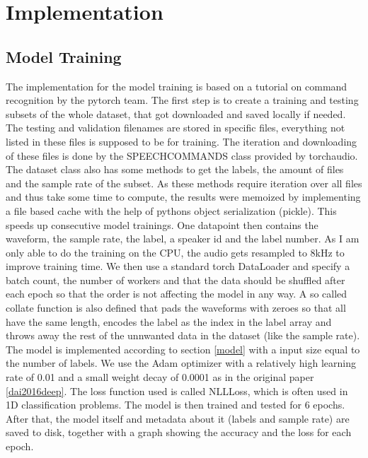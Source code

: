 \chapter{Implementation}

\section{Model Training}
The implementation for the model training is based on a tutorial on command recognition by the pytorch team\cite{tutorial}. The first step is to create a training and 
testing subsets of the whole dataset, that got downloaded and saved locally if needed. The testing and validation filenames are stored in specific files, everything not
listed in these files is supposed to be for training. The iteration and downloading of these files is done by the SPEECHCOMMANDS class provided by torchaudio. The dataset class
also has some methods to get the labels, the amount of files and the sample rate of the subset. As these methods require iteration over all files and thus take some time to compute, 
the results were memoized by implementing a file based cache with the help of pythons object serialization (pickle). This speeds up consecutive model trainings. One datapoint
then contains the waveform, the sample rate, the label, a speaker id and the label number. As I am only able to do the training on the CPU, the audio gets resampled
to 8kHz to improve training time. We then use a standard torch DataLoader and specify a batch count, the number of workers and that the data should be shuffled after each
epoch so that the order is not affecting the model in any way. A so called collate function is also defined that pads the waveforms with zeroes so that all have the same length, encodes
the label as the index in the label array and throws away the rest of the unnwanted data in the dataset (like the sample rate). The model is implemented according to section \ref{model} with
a input size equal to the number of labels. We use the Adam optimizer with a relatively high learning rate of 0.01 and a small weight decay of 0.0001 as in the original paper \ref{dai2016deep}.
The loss function used is called NLLLoss, which is often used in 1D classification problems. The model is then trained and tested for 6 epochs. After that, the model itself 
and metadata about it (labels and sample rate) are saved to disk, together with a graph showing the accuracy and the loss for each epoch.

